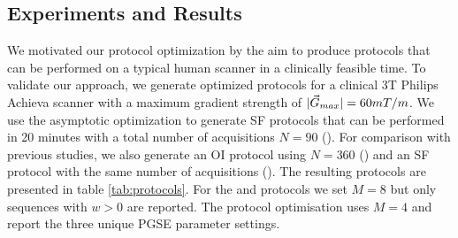 \subsection*{Experiments and Results}
\begin{table}
\centering
\caption{PGSE settings of \SFshort{}, \SFlong{} and \OIlong{} protocols. $\perp$ and $\parallel$ mark acquisitions perpendicular and parallel to the fibre bundles.}
\hspace{0.6cm}
\label{tab:protocols}
\end{table}
We motivated our protocol optimization by the aim to produce protocols that can be performed on a typical human scanner in a clinically feasible time. To validate our approach, we generate optimized protocols for a clinical 3T Philips Achieva scanner with a maximum gradient strength of $|\vec{G}_{max}|=60mT/m$. We use the asymptotic optimization to generate SF protocols that can be performed in 20 minutes with a total number of acquisitions $N=90$ (\SFshort). For comparison with previous studies, we also generate an OI protocol using $N=360$ (\OIlong) and an SF protocol with the same number of acquisitions (\SFlong). The resulting protocols are presented in table \ref{tab:protocols}. For the \SFshort{} and \SFlong{} protocols we set $M=8$ but only sequences with $w>0$ are reported. The \OIlong{} protocol optimisation uses $M=4$ and report the three unique PGSE parameter settings.
